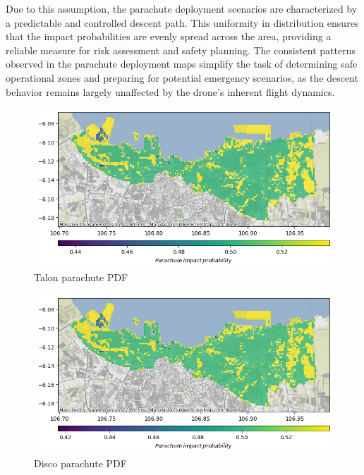 \documentclass[12pt]{report}
\begin{document}
        Due to this assumption, the parachute deployment scenarios are characterized by a predictable and controlled
        descent path. This uniformity in distribution ensures that the impact probabilities are evenly spread across the
        area, providing a reliable measure for risk assessment and safety planning. The consistent patterns observed in
        the parachute deployment maps simplify the task of determining safe operational zones and preparing for
        potential emergency scenarios, as the descent behavior remains largely unaffected by the drone's inherent flight
        dynamics.
        \begin{figure}[H]
            \centering
            \includegraphics[width=\textwidth]{Plot/talon/parachute_pdf.png}
            \caption{Talon parachute PDF}
        \end{figure}
        \begin{figure}[H]
            \centering
            \includegraphics[width=\textwidth]{Plot/parrot/parachute_pdf.png}
            \caption{Disco parachute PDF}
        \end{figure}
\end{document}
